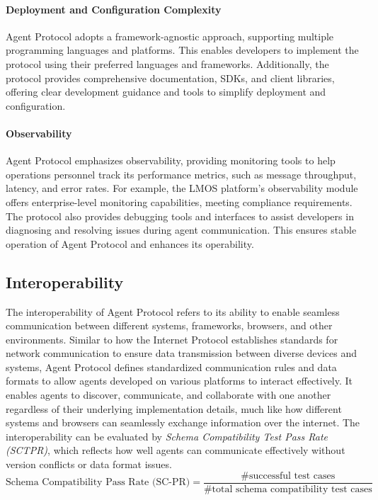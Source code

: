 \documentclass[10pt,preprint]{article}
\begin{document}
\paragraph{Deployment and Configuration Complexity} Agent Protocol adopts a framework-agnostic approach, supporting multiple programming languages and platforms. This enables developers to implement the protocol using their preferred languages and frameworks. Additionally, the protocol provides comprehensive documentation, SDKs, and client libraries, offering clear development guidance and tools to simplify deployment and configuration.

\paragraph{Observability} Agent Protocol emphasizes observability, providing monitoring tools to help operations personnel track its performance metrics, such as message throughput, latency, and error rates. For example, the LMOS platform's observability module offers enterprise-level monitoring capabilities, meeting compliance requirements. The protocol also provides debugging tools and interfaces to assist developers in diagnosing and resolving issues during agent communication. This ensures stable operation of Agent Protocol and enhances its operability.

\subsection{Interoperability}
The interoperability of Agent Protocol refers to its ability to enable seamless communication between different systems, frameworks, browsers, and other environments. Similar to how the Internet Protocol establishes standards for network communication to ensure data transmission between diverse devices and systems, Agent Protocol defines standardized communication rules and data formats to allow agents developed on various platforms to interact effectively. It enables agents to discover, communicate, and collaborate with one another regardless of their underlying implementation details, much like how different systems and browsers can seamlessly exchange information over the internet. 
The interoperability can be evaluated by \textit{Schema Compatibility Test Pass Rate (SCTPR)}, which reflects how well agents can communicate effectively without version conflicts or data format issues.
\begin{equation}
    \text{Schema Compatibility Pass Rate (SC-PR)} = \frac{\#\text{successful test cases}}{\#\text{total schema compatibility test cases}}
\end{equation}
\end{document}
